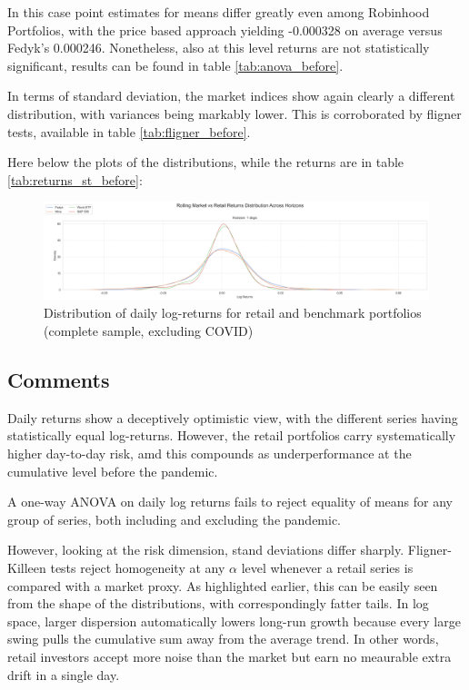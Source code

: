 In this case point estimates for means differ greatly even among Robinhood Portfolios, with the price based approach yielding -0.000328 on average versus Fedyk's 0.000246.
Nonetheless, also at this level returns are not statistically significant, results can be found in table \ref{tab:anova_before}.

In terms of standard deviation, the market indices show again clearly a different distribution, with variances being markably lower. 
This is corroborated by fligner tests, available in table \ref{tab:fligner_before}.

Here below the plots of the distributions, while the returns are in table \ref{tab:returns_st_before}:
\begin{figure}[H]
    \centering
    \includegraphics[width=1\linewidth]
    {../images/distributions/st_before.png}
    \caption{Distribution of daily log-returns for retail and benchmark portfolios (complete sample, excluding COVID)}
\end{figure}

\subsection{Comments}
Daily returns show a deceptively optimistic view, with the different series having statistically equal log-returns.
However, the retail portfolios carry systematically higher day-to-day risk, amd this compounds as underperformance at the cumulative level before the pandemic.

A one-way ANOVA on daily log returns fails to reject equality of means for any group of series, both including and excluding the pandemic. 

However, looking at the risk dimension, stand deviations differ sharply. 
Fligner-Killeen tests reject homogeneity at any $\alpha$ level whenever a retail series is compared with a market proxy.
As highlighted earlier, this can be easily seen from the shape of the distributions, with correspondingly fatter tails.
In log space, larger dispersion automatically lowers long-run growth because every large swing pulls the cumulative sum away from the average trend.
In other words, retail investors accept more noise than the market but earn no meaurable extra drift in a single day.

